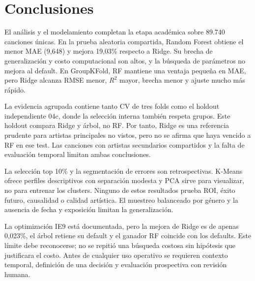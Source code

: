 \section{Conclusiones}

El análisis y el modelamiento completan la etapa académica sobre 89.740 canciones únicas.
En la prueba aleatoria compartida, Random Forest obtiene el menor MAE (9,648) y mejora 19,03\%
respecto a Ridge. Su brecha de generalización y costo computacional son altos, y la búsqueda
de parámetros no mejora al default. En GroupKFold, RF mantiene una ventaja pequeña en MAE,
pero Ridge alcanza RMSE menor, $R^2$ mayor, brecha menor y ajuste mucho más rápido.

La evidencia agrupada contiene tanto CV de tres folds como el holdout independiente 04c, donde
la selección interna también respeta grupos. Este holdout compara Ridge y árbol, no RF. Por
tanto, Ridge es una referencia prudente para artistas principales no vistos, pero no se afirma
que haya vencido a RF en ese test. Las canciones con artistas secundarios compartidos y la falta
de evaluación temporal limitan ambas conclusiones.

La selección top 10\% y la segmentación de errores son retrospectivas. K-Means ofrece perfiles
descriptivos con separación modesta y PCA sirve para visualizar, no para entrenar los clusters.
Ninguno de estos resultados prueba ROI, éxito futuro, causalidad o calidad artística. El
muestreo balanceado por género y la ausencia de fecha y exposición limitan la generalización.

La optimización IE9 está documentada, pero la mejora de Ridge es de apenas 0,023\%, el árbol
retiene su default y el ganador RF coincide con los defaults. Este límite debe reconocerse; no
se repitió una búsqueda costosa sin hipótesis que justificara el costo. Antes de cualquier uso
operativo se requieren contexto temporal, definición de una decisión y evaluación prospectiva
con revisión humana.
